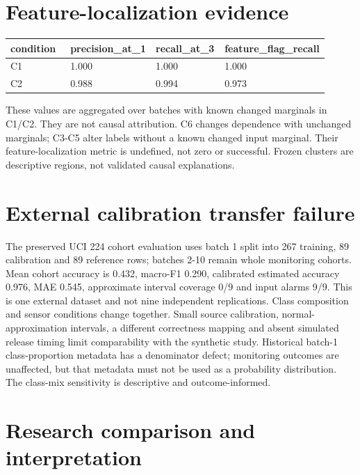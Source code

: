 \documentclass[11pt,a4paper]{article}
\begin{document}
\section{Feature-localization evidence}

\begingroup\scriptsize
\begin{longtable}{p{0.2275\linewidth}p{0.2275\linewidth}p{0.2275\linewidth}p{0.2275\linewidth}}
\toprule
condition & precision\_at\_1 & recall\_at\_3 & feature\_flag\_recall \\
\midrule
C1 & 1.000 & 1.000 & 1.000 \\
C2 & 0.988 & 0.994 & 0.973 \\
\bottomrule
\end{longtable}
\endgroup

These values are aggregated over batches with known changed marginals in C1/C2. They are not causal attribution. C6 changes dependence with unchanged marginals; C3-C5 alter labels without a known changed input marginal. Their feature-localization metric is undefined, not zero or successful. Frozen clusters are descriptive regions, not validated causal explanations.\par

\section{External calibration transfer failure}

The preserved UCI 224 cohort evaluation uses batch 1 split into 267 training, 89 calibration and 89 reference rows; batches 2-10 remain whole monitoring cohorts. Mean cohort accuracy is 0.432, macro-F1 0.290, calibrated estimated accuracy 0.976, MAE 0.545, approximate interval coverage 0/9 and input alarms 9/9. This is one external dataset and not nine independent replications. Class composition and sensor conditions change together. Small source calibration, normal-approximation intervals, a different correctness mapping and absent simulated release timing limit comparability with the synthetic study. Historical batch-1 class-proportion metadata has a denominator defect; monitoring outcomes are unaffected, but that metadata must not be used as a probability distribution. The class-mix sensitivity is descriptive and outcome-informed.\par

\section{Research comparison and interpretation}
\end{document}
